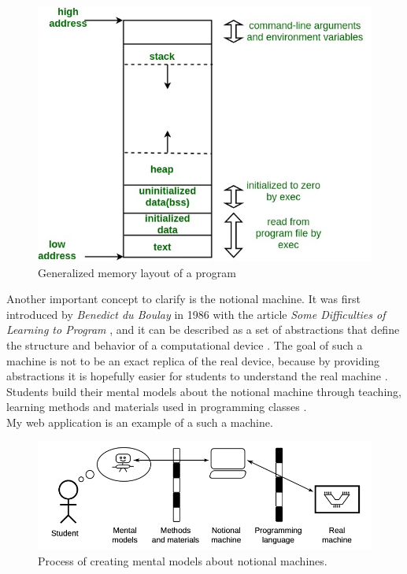 \documentclass[]{usiinfbachelorproject}
\begin{document}
\begin{figure}[h!]
\includegraphics[scale=0.4]{figures/memory_layout.jpg}
\centering
\caption {Generalized memory layout of a program}
\end{figure}
 
\noindent Another important concept to clarify is the notional machine. It was first introduced by \emph{Benedict du Boulay} in 1986 with the article \emph{Some Difficulties of Learning to Program} \cite{boulay}, and it can be described as a set of abstractions that define the structure and behavior of a computational device \cite{guzdial_et_al:DR:2019:11627}. The goal of such a machine is not to be an exact replica of the real device, because by providing abstractions it is hopefully easier for students to understand the real machine \cite{7743153}. Students build their mental models about the notional machine through teaching, learning methods and materials used in programming classes \cite{HIDALGO-CESPEDES2016}.\\
My web application is an example of a such a machine.
 
\begin{figure}[h!]
\includegraphics[scale=0.8]{figures/notional_machine.png}
\centering
\caption {Process of creating mental models about notional machines.}
\end{figure}
 
\end{document}

